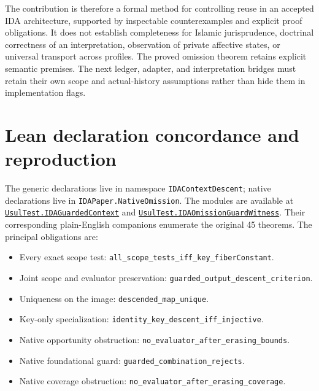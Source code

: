 \documentclass[11pt]{article}
\begin{document}
The contribution is therefore a formal method for controlling reuse in an accepted IDA architecture, supported by inspectable counterexamples and explicit proof obligations. It does not establish completeness for Islamic jurisprudence, doctrinal correctness of an interpretation, observation of private affective states, or universal transport across profiles. The proved omission theorem retains explicit semantic premises. The next ledger, adapter, and interpretation bridges must retain their own scope and actual-history assumptions rather than hide them in implementation flags.

\appendix
\section{Lean declaration concordance and reproduction}

The generic declarations live in namespace \texttt{IDAContextDescent}; native declarations live in \texttt{IDAPaper.NativeOmission}. The modules are available at
\href{https://github.com/larsbx/usul-al-fiqh-deontic-circuits/blob/main/formal/lean/UsulTest/IDAGuardedContext.lean}{\texttt{UsulTest.\allowbreak{}IDAGuardedContext}}
and
\href{https://github.com/larsbx/usul-al-fiqh-deontic-circuits/blob/main/formal/lean/UsulTest/IDAOmissionGuardWitness.lean}{\texttt{UsulTest.\allowbreak{}IDAOmissionGuardWitness}}.
Their corresponding plain-English companions enumerate the original 45 theorems. The principal obligations are:

\begin{itemize}
\item Every exact scope test: \texttt{all\_\allowbreak{}scope\_\allowbreak{}tests\_\allowbreak{}iff\_\allowbreak{}key\_\allowbreak{}fiberConstant}.
\item Joint scope and evaluator preservation: \texttt{guarded\_\allowbreak{}output\_\allowbreak{}descent\_\allowbreak{}criterion}.
\item Uniqueness on the image: \texttt{descended\_map\_unique}.
\item Key-only specialization: \texttt{identity\_\allowbreak{}key\_\allowbreak{}descent\_\allowbreak{}iff\_\allowbreak{}injective}.
\item Native opportunity obstruction: \texttt{no\_\allowbreak{}evaluator\_\allowbreak{}after\_\allowbreak{}erasing\_\allowbreak{}bounds}.
\item Native foundational guard: \texttt{guarded\_\allowbreak{}combination\_\allowbreak{}rejects}.
\item Native coverage obstruction: \texttt{no\_\allowbreak{}evaluator\_\allowbreak{}after\_\allowbreak{}erasing\_\allowbreak{}coverage}.
\end{itemize}
\end{document}
